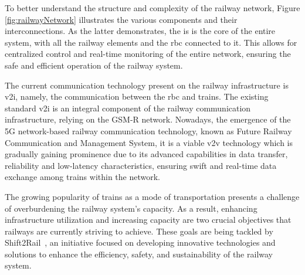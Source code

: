To better understand the structure and complexity of the railway network, Figure \ref{fig:railwayNetwork} illustrates the various components and their interconnections. As the latter demonstrates, the \gls{is} is the core of the entire system, with all the railway elements and the \gls{rbc} connected to it. This allows for centralized control and real-time monitoring of the entire network, ensuring the safe and efficient operation of the railway system.

The current communication technology present on the railway infrastructure is \gls{v2i}, namely, the communication between the \gls{rbc} and trains. The existing standard \gls{v2i} is an integral component of the railway communication infrastructure, relying on the GSM-R network. Nowadays, the emergence of the 5G network-based railway communication technology, known as Future Railway Communication and Management System\cite{frmcs}, it is a viable \gls{v2v} technology which is gradually gaining prominence due to its advanced capabilities in data transfer, reliability and  low-latency characteristics, ensuring swift and real-time data exchange among trains within the network.

\begin{comment}
	The \gls{ertms} system relies on a specific language to convey information through various channels such as radio, balise, and loop airgaps. This language is comprised of several elements, including variables, packets, messages, and telegrams. Variables are used to encode single data values and cannot be divided into minor units. Each variable has a unique name and is associated with a specific meaning as defined in the variable definition. When multiple variables need to be grouped together, they are organized into packets. These packets have a defined internal structure, consisting of a packet header with unique packet numbers, packet lengths, orientation information, distance scales, and an information section containing a set of variables.
\end{comment}

The growing popularity of trains as a mode of transportation presents a challenge of overburdening the railway system's capacity. As a result, enhancing infrastructure utilization and increasing capacity are two crucial objectives that railways are currently striving to achieve. These goals are being tackled by Shift2Rail~\cite{shift2rail}, an initiative focused on developing innovative technologies and solutions to enhance the efficiency, safety, and sustainability of the railway system.

